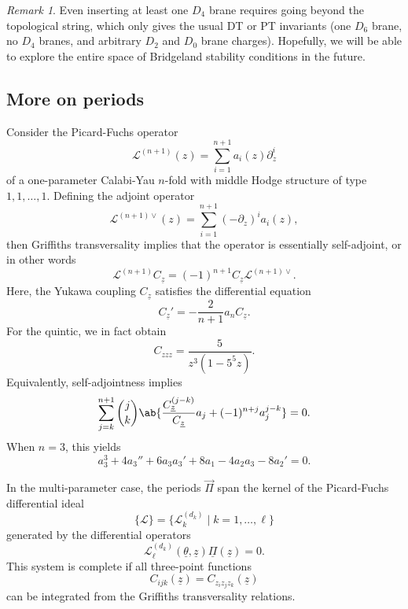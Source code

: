\documentclass[10pt]{amsart}
\theoremstyle{definition}
\theoremstyle{remark}
\newtheorem{rmk}[thm]{Remark}
\theoremstyle{plain}
\theoremstyle{definition}
\theoremstyle{remark}
\newcommand{\mc}[1]{\mathcal{#1}}
\newcommand{\uz}{\ul{z}}
\newcommand{\ul}[1]{\underline{#1}}
\newcommand{\1}{\mathbf{1}}
\newcommand{\2}{\mathbf{2}}
\newcommand{\3}{\mathbf{3}}
\begin{document}
\begin{rmk}
    Even inserting at least one $D_4$ brane requires going beyond the topological string, which only gives the usual DT or PT invariants (one $D_6$ brane, no $D_4$ branes, and arbitrary $D_2$ and $D_0$ brane charges). Hopefully, we will be able to explore the entire space of Bridgeland stability conditions in the future.
\end{rmk}

\subsection{More on periods}%
\label{sub:More on periods}

Consider the Picard-Fuchs operator
\[ \mc{L}^{(n+1)}(z) = \sum_{i=1}^{n+1} a_i(z) \partial_z^i \]
of a one-parameter Calabi-Yau $n$-fold with middle Hodge structure of type $1,1,\ldots, 1$. Defining the adjoint operator
\[ \mc{L}^{(n+1)\vee}(z) = \sum_{i=1}^{n+1}(-\partial_z)^i a_i(z), \]
then Griffiths transversality implies that the operator is essentially self-adjoint, or in other words
\[ \mc{L}^{(n+1)} C_{\uz} = (-1)^{n+1} C_{\uz} \mc{L}^{(n+1)\vee}. \]
Here, the Yukawa coupling $C_{\uz}$ satisfies the differential equation
\[ C_{\uz}' = -\frac{2}{n+1} a_n C_{\uz}. \]
For the quintic, we in fact obtain
\[ C_{zzz}= \frac{5}{z^3(1-5^5z)}. \]
Equivalently, self-adjointness implies
\[ \sum_{j=k}^{n+1} \binom{j}{k} \ab\{ \frac{C_{\uz}^{(j-k)}}{C_{\uz}} a_j + (-1)^{n+j}a_j^{j-k}\} = 0. \]
When $n=3$, this yields
\[ a_3^3 + 4a_3'' + 6a_3 a_3' + 8 a_1 - 4 a_2a_3 - 8 a_2' = 0. \]

In the multi-parameter case, the periods $\vec{\Pi}$ span the kernel of the Picard-Fuchs differential ideal
\[ \{ \mc{L}\} = \{ \mc{L}_k^{(d_k)} \mid k = 1,\ldots,\ell\} \]
generated by the differential operators
\[ \mc{L}_{\ell}^{(d_k)}(\ul{\theta}, \uz) \ul{\Pi}(\uz) = 0. \]
This system is complete if all three-point functions
\[ C_{ijk}(\uz) = C_{z_iz_jz_k}(\uz) \]
can be integrated from the Griffiths transversality relations.
\end{document}
